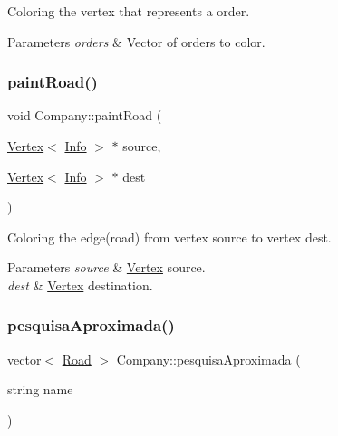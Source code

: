 Coloring the vertex that represents a order. 


\begin{DoxyParams}{Parameters}
{\em orders} & Vector of orders to color. \\
\hline
\end{DoxyParams}
\mbox{\label{class_company_a7511f8d62b4ab7640d8c00fb105cd6e2}} 
\subsubsection{\texorpdfstring{paint\+Road()}{paintRoad()}}
{\footnotesize\ttfamily void Company\+::paint\+Road (\begin{DoxyParamCaption}\item[{\hyperlink{class_vertex}{Vertex}$<$ \hyperlink{class_info}{Info} $>$ $\ast$}]{source,  }\item[{\hyperlink{class_vertex}{Vertex}$<$ \hyperlink{class_info}{Info} $>$ $\ast$}]{dest }\end{DoxyParamCaption})}



Coloring the edge(road) from vertex source to vertex dest. 


\begin{DoxyParams}{Parameters}
{\em source} & \hyperlink{class_vertex}{Vertex} source. \\
\hline
{\em dest} & \hyperlink{class_vertex}{Vertex} destination. \\
\hline
\end{DoxyParams}
\mbox{\label{class_company_adec1bb75aae59543cd1ad3186b67d960}} 
\subsubsection{\texorpdfstring{pesquisa\+Aproximada()}{pesquisaAproximada()}}
{\footnotesize\ttfamily vector$<$ \hyperlink{class_road}{Road} $>$ Company\+::pesquisa\+Aproximada (\begin{DoxyParamCaption}\item[{string}]{name }\end{DoxyParamCaption})}



